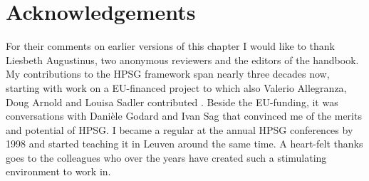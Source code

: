 \documentclass[output=paper
	        ,collection
	        ,collectionchapter
 	        ,biblatex
                ,babelshorthands
                ,newtxmath
                ,draftmode
                ,colorlinks, citecolor=brown
]{langscibook}
\begin{document}
 
\section*{Acknowledgements}


For their comments on earlier versions of this chapter I would like to thank 
Liesbeth Augustinus, two anonymous reviewers and the editors of the handbook.  
My contributions to the HPSG framework span nearly three decades now, 
starting with work on a EU-financed project to which also Valerio Allegranza, 
Doug Arnold and Louisa Sadler contributed \citep{VanEyndeSchmidt98}. 
Beside the EU-funding, it was conversations with Dani\`ele Godard and Ivan Sag 
that convinced me of the merits and potential of HPSG.  
I became a regular at the annual HPSG conferences by 1998 and started teaching it in Leuven around 
the same time. A heart-felt thanks goes to the colleagues who over the years have created such a stimulating
environment to work in.        

{\sloppy
\printbibliography[heading=subbibliography,notkeyword=this] 
}
\end{document}
